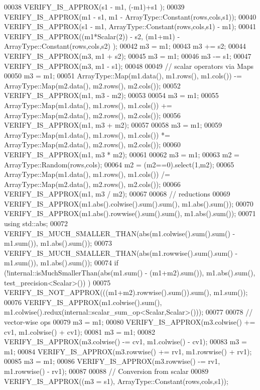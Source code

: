 \begin{DoxyCode}
00038   VERIFY\_IS\_APPROX(s1 - m1, (-m1)+s1 );
00039   VERIFY\_IS\_APPROX(m1 - s1, m1 - ArrayType::Constant(rows,cols,s1));
00040   VERIFY\_IS\_APPROX(s1 - m1, ArrayType::Constant(rows,cols,s1) - m1);
00041   VERIFY\_IS\_APPROX((m1*Scalar(2)) - s2, (m1+m1) - ArrayType::Constant(rows,cols,s2) );
00042   m3 = m1;
00043   m3 += s2;
00044   VERIFY\_IS\_APPROX(m3, m1 + s2);
00045   m3 = m1;
00046   m3 -= s1;
00047   VERIFY\_IS\_APPROX(m3, m1 - s1);  
00048   
00049   \textcolor{comment}{// scalar operators via Maps}
00050   m3 = m1;
00051   ArrayType::Map(m1.data(), m1.rows(), m1.cols()) -= ArrayType::Map(m2.data(), m2.rows(), m2.cols());
00052   VERIFY\_IS\_APPROX(m1, m3 - m2);
00053   
00054   m3 = m1;
00055   ArrayType::Map(m1.data(), m1.rows(), m1.cols()) += ArrayType::Map(m2.data(), m2.rows(), m2.cols());
00056   VERIFY\_IS\_APPROX(m1, m3 + m2);
00057   
00058   m3 = m1;
00059   ArrayType::Map(m1.data(), m1.rows(), m1.cols()) *= ArrayType::Map(m2.data(), m2.rows(), m2.cols());
00060   VERIFY\_IS\_APPROX(m1, m3 * m2);
00061   
00062   m3 = m1;
00063   m2 = ArrayType::Random(rows,cols);
00064   m2 = (m2==0).select(1,m2);
00065   ArrayType::Map(m1.data(), m1.rows(), m1.cols()) /= ArrayType::Map(m2.data(), m2.rows(), m2.cols());  
00066   VERIFY\_IS\_APPROX(m1, m3 / m2);
00067 
00068   \textcolor{comment}{// reductions}
00069   VERIFY\_IS\_APPROX(m1.abs().colwise().sum().sum(), m1.abs().sum());
00070   VERIFY\_IS\_APPROX(m1.abs().rowwise().sum().sum(), m1.abs().sum());
00071   \textcolor{keyword}{using} std::abs;
00072   VERIFY\_IS\_MUCH\_SMALLER\_THAN(abs(m1.colwise().sum().sum() - m1.sum()), m1.abs().sum());
00073   VERIFY\_IS\_MUCH\_SMALLER\_THAN(abs(m1.rowwise().sum().sum() - m1.sum()), m1.abs().sum());
00074   \textcolor{keywordflow}{if} (!internal::isMuchSmallerThan(abs(m1.sum() - (m1+m2).sum()), m1.abs().sum(), test\_precision<Scalar>())
      )
00075       VERIFY\_IS\_NOT\_APPROX(((m1+m2).rowwise().sum()).sum(), m1.sum());
00076   VERIFY\_IS\_APPROX(m1.colwise().sum(), m1.colwise().redux(internal::scalar\_sum\_op<Scalar,Scalar>()));
00077 
00078   \textcolor{comment}{// vector-wise ops}
00079   m3 = m1;
00080   VERIFY\_IS\_APPROX(m3.colwise() += cv1, m1.colwise() + cv1);
00081   m3 = m1;
00082   VERIFY\_IS\_APPROX(m3.colwise() -= cv1, m1.colwise() - cv1);
00083   m3 = m1;
00084   VERIFY\_IS\_APPROX(m3.rowwise() += rv1, m1.rowwise() + rv1);
00085   m3 = m1;
00086   VERIFY\_IS\_APPROX(m3.rowwise() -= rv1, m1.rowwise() - rv1);
00087   
00088   \textcolor{comment}{// Conversion from scalar}
00089   VERIFY\_IS\_APPROX((m3 = s1), ArrayType::Constant(rows,cols,s1));

\end{DoxyCode}
